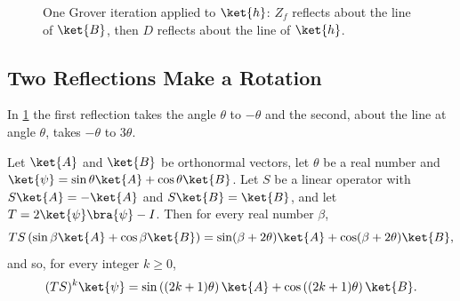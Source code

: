 \begin{figure}[ht]
    \centering
    \caption{One Grover iteration applied to $\ket{h}$: $Z_f$ reflects about the line of $\ket{B}$,
        then $D$ reflects about the line of $\ket{h}$.}
    \label{fig:reflections-1008}
\end{figure}

\subsection{Two Reflections Make a Rotation}

In \cref{fig:reflections-1008} the first reflection takes the angle $\theta$ to $-\theta$ and the
second, about the line at angle $\theta$, takes $-\theta$ to $3\theta$.

\begin{claim}\label{lem:tworef-1008}
    Let $\ket{A}$ and $\ket{B}$ be orthonormal vectors, let $\theta$ be a real number and
    $\ket{\psi} = \sin\theta \ket{A} + \cos\theta \ket{B}$. Let $S$ be a linear operator with
    $S\ket{A} = -\ket{A}$ and $S\ket{B} = \ket{B}$, and let $T = 2\ket{\psi}\bra{\psi} - I$. Then for
    every real number $\beta$,
    \[T S \left(\sin\beta \ket{A} + \cos\beta \ket{B}\right)
        = \sin(\beta + 2\theta) \ket{A} + \cos(\beta + 2\theta) \ket{B},\]
    and so, for every integer $k \geq 0$,
    \[(TS)^k \ket{\psi} = \sin\left((2k+1)\theta\right) \ket{A} + \cos\left((2k+1)\theta\right) \ket{B}.\]
\end{claim}

